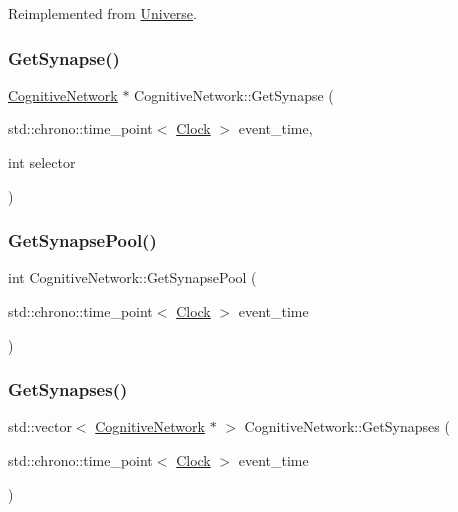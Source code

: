 Reimplemented from \mbox{\hyperlink{classUniverse_af0f4b81950061e63c2855eb40957a5b1}{Universe}}.

\mbox{\label{classCognitiveNetwork_a1944aaa13667bc267e6ef44892da969d}} 
\subsubsection{\texorpdfstring{Get\+Synapse()}{GetSynapse()}}
{\footnotesize\ttfamily \mbox{\hyperlink{classCognitiveNetwork}{Cognitive\+Network}} $\ast$ Cognitive\+Network\+::\+Get\+Synapse (\begin{DoxyParamCaption}\item[{std\+::chrono\+::time\+\_\+point$<$ \mbox{\hyperlink{universe_8h_a0ef8d951d1ca5ab3cfaf7ab4c7a6fd80}{Clock}} $>$}]{event\+\_\+time,  }\item[{int}]{selector }\end{DoxyParamCaption})}

\mbox{\label{classCognitiveNetwork_ae0068b9df823e1b10fed3c73f1cb4702}} 
\subsubsection{\texorpdfstring{Get\+Synapse\+Pool()}{GetSynapsePool()}}
{\footnotesize\ttfamily int Cognitive\+Network\+::\+Get\+Synapse\+Pool (\begin{DoxyParamCaption}\item[{std\+::chrono\+::time\+\_\+point$<$ \mbox{\hyperlink{universe_8h_a0ef8d951d1ca5ab3cfaf7ab4c7a6fd80}{Clock}} $>$}]{event\+\_\+time }\end{DoxyParamCaption})\hspace{0.3cm}{\ttfamily [inline]}}

\mbox{\label{classCognitiveNetwork_aa3376f2e7aed9639c2b5ba27aa6fb314}} 
\subsubsection{\texorpdfstring{Get\+Synapses()}{GetSynapses()}}
{\footnotesize\ttfamily std\+::vector$<$ \mbox{\hyperlink{classCognitiveNetwork}{Cognitive\+Network}} $\ast$ $>$ Cognitive\+Network\+::\+Get\+Synapses (\begin{DoxyParamCaption}\item[{std\+::chrono\+::time\+\_\+point$<$ \mbox{\hyperlink{universe_8h_a0ef8d951d1ca5ab3cfaf7ab4c7a6fd80}{Clock}} $>$}]{event\+\_\+time }\end{DoxyParamCaption})}

